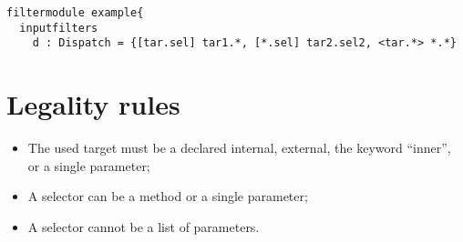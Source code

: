 \begin{lstlisting}[caption={Some possible substitution parts},label=lst::ARM:ARMSP:example1,
style=listing,language =ComposeStar,float=tpb]
filtermodule example{
  inputfilters
    d : Dispatch = {[tar.sel] tar1.*, [*.sel] tar2.sel2, <tar.*> *.*}
\end{lstlisting}

\section*{Legality rules}
\begin{itemize}[noitemsep]
\item The used target must be a declared internal, external, the keyword ``inner'', or a single parameter;
\item A selector can be a method or a single parameter;
\item A selector cannot be a list of parameters.
\end{itemize}


\comments{}

